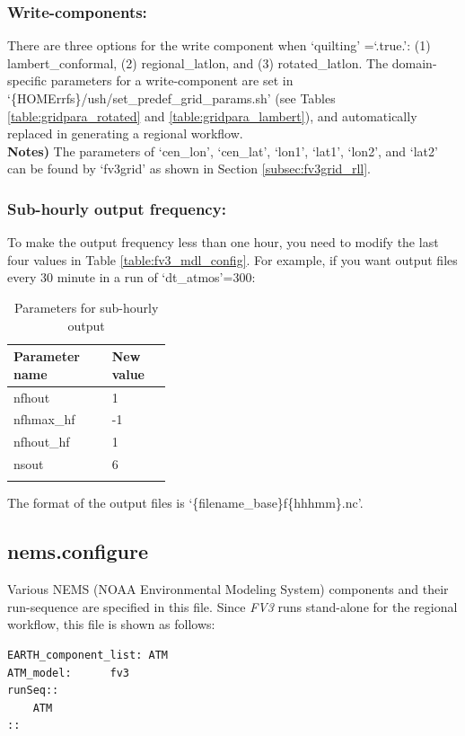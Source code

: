 \documentclass[11pt,fleqn]{report}              %
\begin{document}
\subsubsection{Write-components:}

There are three options for the write component when `quilting' =`.true.': (1) lambert\_conformal, (2) regional\_latlon, and (3) rotated\_latlon. The domain-specific parameters for a write-component are set in `\{HOMErrfs\}/ush/set\_predef\_grid\_params.sh' (see Tables \ref{table:gridpara_rotated} and \ref{table:gridpara_lambert}), and automatically replaced in generating a regional workflow.\\

{\bf Notes)} The parameters of `cen\_lon', `cen\_lat', `lon1', `lat1', `lon2', and `lat2' can be found by `fv3grid' as shown in Section \ref{subsec:fv3grid_rll}.


\subsubsection{Sub-hourly output frequency:}

To make the output frequency less than one hour, you need to modify the last four values in Table \ref{table:fv3_mdl_config}. For example, if you want output files every 30 minute in a run of `dt\_atmos'=300:
{
\fontsize{10}{12}\selectfont
\begin{longtable}{p{0.2\linewidth} | p{0.15\linewidth}  }
\hline
\hline
Parameter name & New value  \\
\hline
 nfhout  &  1 \\
 nfhmax\_hf & -1 \\
 nfhout\_hf & 1 \\
 nsout & 6 \\
\hline
\caption{Parameters for sub-hourly output}
\label{table:wrtcmp_subhour}
\end{longtable}
}

The format of the output files is `\{filename\_base\}f\{hhhmm\}.nc'. 



\subsection{nems.configure}
\label{subsec:nems_config}

Various NEMS (NOAA Environmental Modeling System) components and their run-sequence are specified in this file. Since {\it FV3} runs stand-alone for the regional workflow, this file is shown as follows:
\lstset{language=bash}   
\begin{lstlisting}[frame=trBL, basicstyle=\scriptsize]
EARTH_component_list: ATM
ATM_model:		fv3
runSeq::
	ATM
::
\end{lstlisting}
\end{document}
